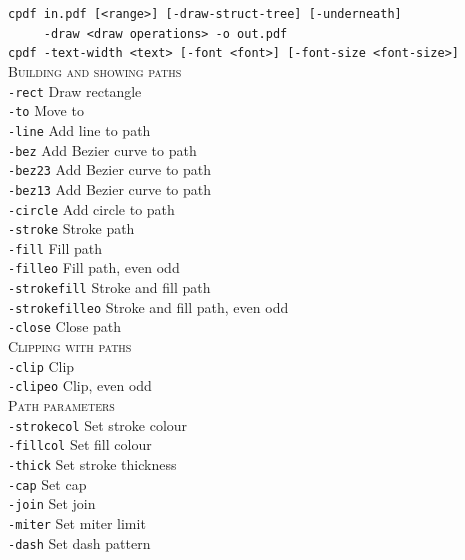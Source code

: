 \documentclass{book}
\begin{document}
  {\small\begin{framed}

   \noindent\verb!cpdf in.pdf [<range>] [-draw-struct-tree] [-underneath]!\\
   \noindent\verb!     -draw <draw operations> -o out.pdf!\\

   \noindent\verb!cpdf -text-width <text> [-font <font>] [-font-size <font-size>]!\\

   \vspace{1.5mm}
   \noindent \textsc{Building and showing paths}\\
   \noindent\verb!-rect! Draw rectangle\\
   \noindent\verb!-to! Move to\\
   \noindent\verb!-line! Add line to path\\
   \noindent\verb!-bez! Add Bezier curve to path\\
   \noindent\verb!-bez23! Add Bezier curve to path\\
   \noindent\verb!-bez13! Add Bezier curve to path\\
   \noindent\verb!-circle! Add circle to path\\
   \noindent\verb!-stroke! Stroke path\\
   \noindent\verb!-fill! Fill path\\
   \noindent\verb!-filleo! Fill path, even odd\\
   \noindent\verb!-strokefill! Stroke and fill path\\
   \noindent\verb!-strokefilleo! Stroke and fill path, even odd\\
   \noindent\verb!-close! Close path\\

   \vspace{1.5mm}
   \noindent \textsc{Clipping with paths}\\
   \noindent\verb!-clip! Clip\\
   \noindent\verb!-clipeo! Clip, even odd\\

   \vspace{1.5mm}
   \noindent \textsc{Path parameters}\\
   \noindent\verb!-strokecol! Set stroke colour\\
   \noindent\verb!-fillcol! Set fill colour\\
   \noindent\verb!-thick! Set stroke thickness\\
   \noindent\verb!-cap! Set cap\\
   \noindent\verb!-join! Set join\\
   \noindent\verb!-miter! Set miter limit\\
   \noindent\verb!-dash! Set dash pattern\\


\end{framed}}
\end{document}
